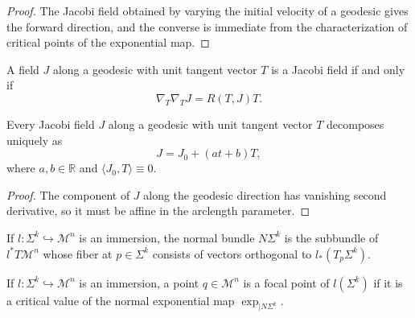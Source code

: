 \begin{proof}
\sketch The Jacobi field obtained by varying the initial velocity of a geodesic gives the forward direction, and the converse is immediate from the characterization of critical points of the exponential map.
\end{proof}

\begin{lemma}
\label{appb-lem-jacobi-equation}
A field $J$ along a geodesic with unit tangent vector $T$ is a Jacobi field if and only if
\[
\nabla_T\nabla_T J = R(T,J)T.
\]
\end{lemma}

\begin{corollary}
\label{appb-cor-jacobi-orthogonal-decomposition}
Every Jacobi field $J$ along a geodesic with unit tangent vector $T$ decomposes uniquely as
\[
J = J_0 + (at+b)T,
\]
where $a,b\in\mathbb R$ and $\langle J_0,T\rangle\equiv 0$.
\end{corollary}

\begin{proof}
\sketch The component of $J$ along the geodesic direction has vanishing second derivative, so it must be affine in the arclength parameter.
\end{proof}

\begin{definition}
\label{appb-def-normal-bundle}
If $l:\Sigma^k\hookrightarrow \mathcal M^n$ is an immersion, the normal bundle $N\Sigma^k$ is the subbundle of $l^*T\mathcal M^n$ whose fiber at $p\in\Sigma^k$ consists of vectors orthogonal to $l_*(T_p\Sigma^k)$.
\end{definition}

\begin{definition}
\label{appb-def-focal-point}
If $l:\Sigma^k\hookrightarrow\mathcal M^n$ is an immersion, a point $q\in\mathcal M^n$ is a focal point of $l(\Sigma^k)$ if it is a critical value of the normal exponential map $\exp_{\mid N\Sigma^k}$.
\end{definition}

